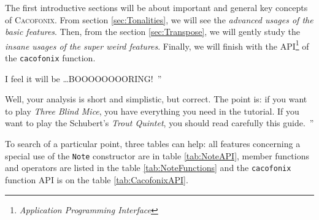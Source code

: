 \documentclass{article}
\newcommand{\cacofonix}{\textsc{Cacofonix}\xspace}
\newcommand{\note}{\lstinline!Note!\xspace}
\newenvironment{meenv}{ \par \noindent \makebox[6em][r]{ \textcolor{mecolor}{Me}: `` --~}}{~''}
\newenvironment{myselfenv}{ \par \noindent \makebox[6em][r]{ \textcolor{myselfcolor}{Myself}: `` --~}}{~''}
\newcommand{\me}[1]{\begin{meenv}#1\end{meenv}}
\newcommand{\myself}[1]{\begin{myselfenv}#1\end{myselfenv}}
\begin{document}
The first introductive sections will be about important and general key concepts of \cacofonix. From section \ref{sec:Tonalities}, we will see the \emph{advanced usages of the basic features}. Then, from the section \ref{sec:Transpose}, we will gently study the \emph{insane usages of the super weird features}. Finally, we will finish with the API\footnote{\emph{Application Programming Interface}} of the \lstinline!cacofonix! function.

\me{I feel it will be \dots BOOOOOOOORING!}
\myself{Well, your analysis is short and simplistic, but correct. The point is: if you want to play \emph{Three Blind Mice}, you have everything you need in the tutorial. If you want to play the Schubert's \emph{Trout Quintet}, you should read carefully this guide.}

To search of a particular point, three tables can help: all features concerning a special use of the \note constructor are in table \ref{tab:NoteAPI}, member functions and operators are listed in the table \ref{tab:NoteFunctions} and the \lstinline!cacofonix! function API is on the table \ref{tab:CacofonixAPI}.
\end{document}
